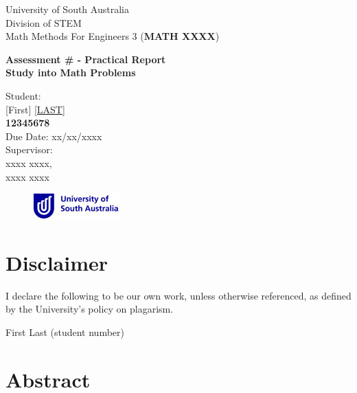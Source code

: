 \documentclass[12pt]{article}
\begin{document}
\begin{titlepage}
\centering
{\Large University of South Australia\\Division of STEM\\[1\baselineskip]}
{\Large Math Methods For Engineers 3 (\textbf{MATH XXXX})\\}
{\Huge \textbf{Assessment # - Practical Report} \\[4\baselineskip]\vfill
{\Huge \textbf{Study into Math Problems}}
\par\vfill
{\large Student:\\}
{\Large [First] \underline{[LAST]}\\\textbf{12345678} \\}
\vspace*{4\baselineskip}
{\Large Due Date: xx/xx/xxxx\\}
\vspace*{\baselineskip}
{\large Supervisor:\\}
{\large xxxx xxxx,\\xxxx xxxx}


\begin{figure}[b]\raggedleft
\includegraphics{images/UniSAlogo}
\end{figure}}
\end{titlepage}
\clearpage



\section*{Disclaimer}
I declare the following to be our own work, unless otherwise referenced, as defined by the University's policy on plagarism.
\begin{flushright}First Last (student number)\\\vspace*{\baselineskip}\end{flushright}
\clearpage

\section*{Abstract}

\clearpage

\tableofcontents
\listoffigures
\listoftables
\clearpage
\end{document}
